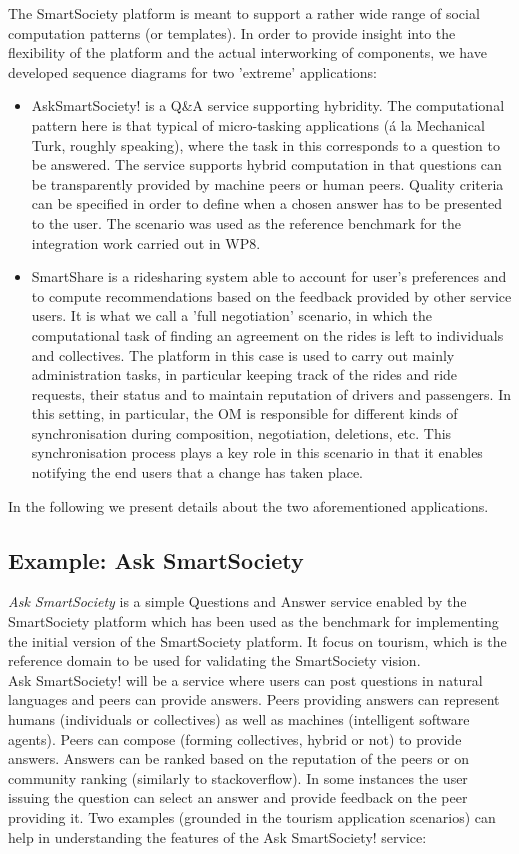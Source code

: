 The SmartSociety platform is meant to support a rather wide range of
social computation patterns (or templates). In order to provide
insight into the flexibility of the platform and the actual
interworking of components, we have developed sequence diagrams for two
'extreme' applications:
\begin{itemize}
\item AskSmartSociety! is a Q\&A service supporting hybridity. The
computational pattern here is that typical of micro-tasking
applications (\'a la Mechanical Turk, roughly speaking), where the
task in this corresponds to a question to be answered. The service
supports hybrid computation in that questions can be transparently
provided by machine peers or human peers. Quality criteria can be
specified in order to define when a chosen answer has to be presented
to the user. The scenario was used as the reference benchmark for the integration work carried out in WP8.

\item SmartShare is a ridesharing system able to account for user's
preferences and to compute recommendations based on the feedback
provided by other service users. It is what we call a 'full
negotiation' scenario, in which the computational task of finding an
agreement on the rides is left to individuals and collectives. The
platform in this case is used to carry out mainly administration tasks, in
particular keeping track of the rides and ride requests, their status
and to maintain reputation of drivers and passengers. In this setting, in particular, the OM is responsible for different kinds of synchronisation during composition, negotiation, deletions, etc. This synchronisation process plays a key role in this scenario in that it enables notifying the end users that a change has taken place. 
\end{itemize}
In the following we present details about the two aforementioned
applications. 


\subsection{Example: Ask SmartSociety}\label{sec:asksmartsoc}
\textit{Ask SmartSociety} is a simple Questions and Answer service enabled by the SmartSociety platform which has been used as the benchmark for implementing the initial version of the SmartSociety platform. It focus on tourism, which is the reference domain to be used for validating the SmartSociety vision.\\
Ask SmartSociety! will be a service where users can post questions in natural languages and peers can provide answers. Peers providing answers can represent humans (individuals or collectives) as well as machines (intelligent software agents). Peers can compose (forming collectives, hybrid or not) to provide answers. Answers can be ranked based on the reputation of the peers or on community ranking (similarly to stackoverflow). In some instances the user issuing the question can select an answer and provide feedback on the peer providing it.
Two examples (grounded in the tourism application scenarios) can help in understanding the features of the Ask SmartSociety! service:

